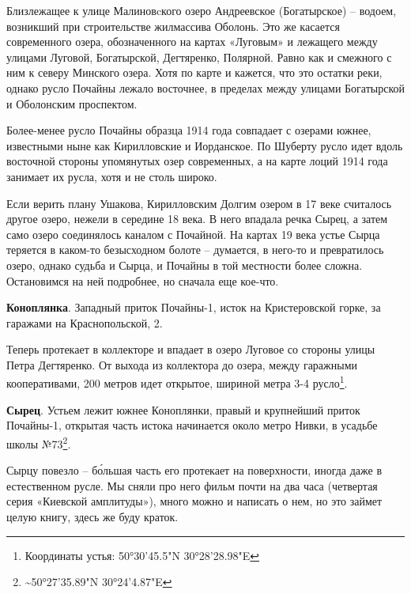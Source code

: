 Близлежащее к улице Малиновcкого озеро Андреевское (Богатырское) – водоем, возникший при строительстве жилмассива Оболонь. Это же касается современного озера, обозначенного на картах «Луговым» и лежащего между улицами Луговой, Богатырской, Дегтяренко, Полярной. Равно как и смежного с ним к северу Минского озера. Хотя по карте и кажется, что это остатки реки, однако русло Почайны лежало восточнее, в пределах между улицами Богатырской и Оболонским проспектом.

Более-менее русло Почайны образца 1914 года совпадает с озерами южнее, известными ныне как Кирилловские и Иорданское. По Шуберту русло идет вдоль восточной стороны упомянутых озер современных, а на карте лоций 1914 года занимает их русла, хотя и не столь широко.

Если верить плану Ушакова, Кирилловским Долгим озером в 17 веке считалось другое озеро, нежели в середине 18 века. В него впадала речка Сырец, а затем само озеро соединялось каналом с Почайной. На картах 19 века устье Сырца теряется в каком-то безысходном болоте – думается, в него-то и превратилось озеро, однако судьба и Сырца, и Почайны в той местности более сложна. Остановимся на ней подробнее, но сначала еще кое-что.

\textbf{Коноплянка}. Западный приток Почайны-1, исток на Кристеровской горке, за гаражами на Краснопольской, 2. 

Теперь протекает в коллекторе и впадает в озеро Луговое со стороны улицы Петра Дегтяренко. От выхода из коллектора до озера, между гаражными кооперативами, 200 метров идет открытое, шириной метра 3-4 русло\footnote{Координаты устья: 50°30'45.5"N 30°28'28.98"E}. 

\textbf{Сырец}. Устьем лежит южнее Коноплянки, правый и крупнейший приток Почайны-1, открытая часть истока начинается около метро Нивки, в усадьбе школы №73\footnote{\textasciitilde{}50°27'35.89"N  30°24'4.87"E}.

Сырцу повезло – б\'ольшая часть его протекает на поверхности, иногда даже в естественном русле. Мы сняли про него фильм почти на два часа (четвертая серия «Киевской амплитуды»), много можно и написать о нем, но это займет целую книгу, здесь же буду краток.

